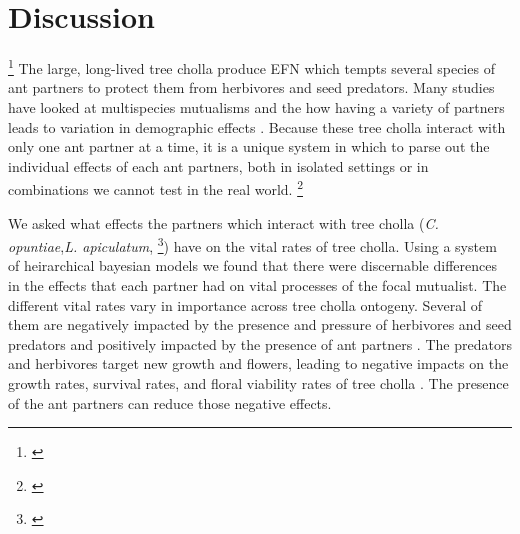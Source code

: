 \documentclass[11pt]{article}
\newcommand{\tom}[2]{{\color{red}{#1}}\footnote{\textit{\color{red}{#2}}}}
\begin{document}
\section*{Discussion}
\tom{}{I have not commented too heavily here because I would like to talk through what we want this section to achieve. Currently, most of this section is actually describing results, whereas the pupose is to interpret and contextualize results, and connect them to the broader literature. Some of your content here is actually better at describing results than you had in the Results section, because it includes that element of ``how is this connected to the question'' that was missing from the Results section.}
The large, long-lived tree cholla produce EFN which tempts several species of ant partners to protect them from herbivores and seed predators. 
Many studies have looked at multispecies mutualisms and the how having a variety of partners leads to variation in demographic effects \cite{Palmer2010, Bascompte2019, Stachowicz2005, Ford2015, Baez2016}. 
Because these tree cholla interact with only one ant partner at a time, it is a unique system in which to parse out the individual effects of each ant partners, both in isolated settings or in combinations we cannot test in the real world. \tom{}{This is a good start. In general, I suggest opening the Discussion section with a brief summary of what you were trying to learn in this study, what you found, and its broader significance. This paragraph does a little of that, but I think it can be stronger.}


We asked what effects the partners which interact with tree cholla (\textit{C. opuntiae},\textit{L. apiculatum}, \tom{and more}{I would not say this.}) have on the vital rates of tree cholla. 
Using a system of heirarchical bayesian models we found that there were discernable differences in the effects that each partner had on vital processes of the focal mutualist. 
The different vital rates vary in importance across tree cholla ontogeny.
Several of them are negatively impacted by the presence and pressure of herbivores and seed predators \cite{Miller2009, Miller2006} and positively impacted by the presence of ant partners \cite{Miller2007}.
The predators and herbivores target new growth and flowers, leading to negative impacts on the growth rates, survival rates, and floral viability rates of tree cholla \cite{Louda1995, Agrawal2004}.
The presence of the ant partners can reduce those negative effects.
\end{document}
